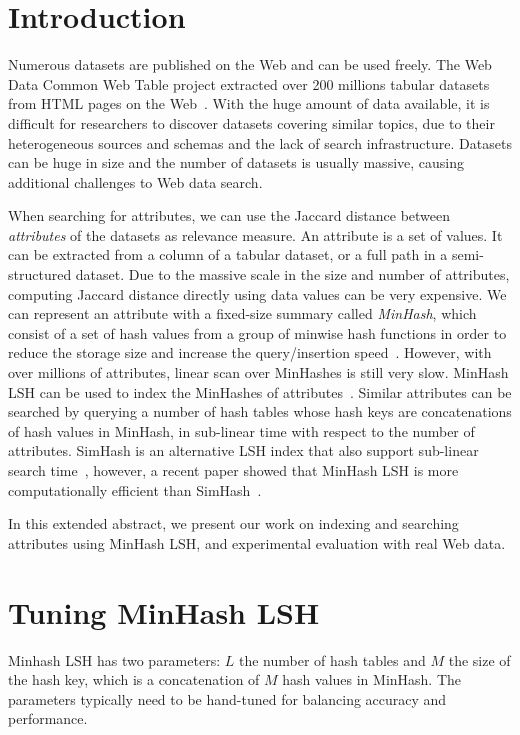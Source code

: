 \documentclass{sig-alternate}
\begin{document}
\section{Introduction}
Numerous datasets are published on the Web and can be used freely.
The Web Data Common Web Table project extracted over 200 millions tabular 
datasets from HTML pages on the Web~\cite{Lehmberg:WWW:2016}.
With the huge amount of data available, it is difficult for researchers to discover datasets covering similar topics, due to their heterogeneous sources and schemas and the lack of search infrastructure. Datasets can be huge in size and the number of datasets is usually massive, causing additional challenges to Web data search.

When searching for attributes, we can use the Jaccard distance between
{\it attributes} of the datasets as relevance measure.
An attribute is a set of values. 
It can be extracted from a column of a tabular dataset, or a full path in
a semi-structured dataset.
Due to the massive scale in the size and number of attributes,
computing Jaccard distance directly using data values can be very expensive.
We can represent an attribute with a fixed-size summary called {\it MinHash},
which consist of a set of hash values from a group of minwise hash functions in order to reduce the storage size and increase the query/insertion speed~\cite{Broder:1997:RCD:829502.830043}.
However, with over millions of attributes, linear scan over MinHashes is still very slow.
MinHash LSH can be used to index the MinHashes of attributes~\cite{Indyk:1998:ANN:276698.276876}. 
Similar attributes can be searched by querying a number of hash tables whose hash keys are concatenations of hash values in MinHash, in sub-linear time with respect to the number of attributes.
SimHash is an alternative LSH index that also support sub-linear search time~\cite{Charikar:2002:SET:509907.509965}, however,
a recent paper showed that MinHash LSH is more computationally efficient than SimHash~\cite{simhash:minhash}.

In this extended abstract, we present our work on indexing and searching
attributes using MinHash LSH, and experimental evaluation with real Web data.

\section{Tuning MinHash LSH}
Minhash LSH has two parameters: $L$ the number of hash tables
and $M$ the size of the hash key, which is a concatenation of 
$M$ hash values in MinHash.
The parameters typically need to be hand-tuned for balancing
accuracy and performance.
\end{document}
